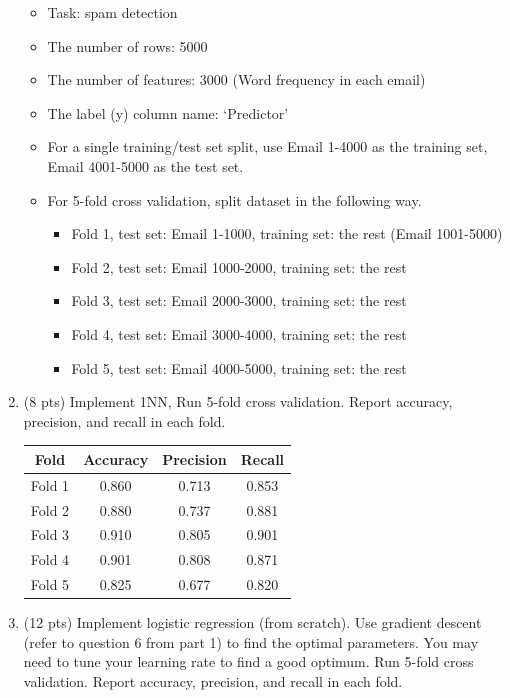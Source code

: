 \documentclass[a4paper]{article}
\theoremstyle{definition}
\newenvironment{soln}{
    \leavevmode\color{blue}\ignorespaces
}{}
\begin{document}
\begin{enumerate}
	\begin{itemize}
		\item Task: spam detection
		\item The number of rows: 5000
		\item The number of features: 3000 (Word frequency in each email)
		\item The label (y) column name: `Predictor'
		\item For a single training/test set split, use Email 1-4000 as the training set, Email 4001-5000 as the test set.
		\item For 5-fold cross validation, split dataset in the following way.
		\begin{itemize}
			\item Fold 1, test set: Email 1-1000, training set: the rest (Email 1001-5000)
			\item Fold 2, test set: Email 1000-2000, training set: the rest
			\item Fold 3, test set: Email 2000-3000, training set: the rest
			\item Fold 4, test set: Email 3000-4000, training set: the rest
			\item Fold 5, test set: Email 4000-5000, training set: the rest			
		\end{itemize}
	\end{itemize}
	
	\item (8 pts) Implement 1NN, Run 5-fold cross validation. Report accuracy, precision, and recall in each fold.
	
	\begin{soln}
		\begin{center}
			\begin{tabular}{ c  c  c  c }
				\hline
				Fold & Accuracy & Precision & Recall \\ \hline
				Fold 1 & 0.860 & 0.713 & 0.853 \\
				Fold 2 & 0.880 & 0.737 & 0.881 \\
				Fold 3 & 0.910 & 0.805 & 0.901 \\
				Fold 4 & 0.901 & 0.808 & 0.871 \\
				Fold 5 & 0.825 & 0.677 & 0.820 \\
				\hline
			\end{tabular}
		\end{center}
	\end{soln}
	
	\item (12 pts) Implement logistic regression (from scratch). Use gradient descent (refer to question 6 from part 1) to find the optimal parameters. You may need to tune your learning rate to find a good optimum. Run 5-fold cross validation. Report accuracy, precision, and recall in each fold.
	

\end{enumerate}
\end{document}
